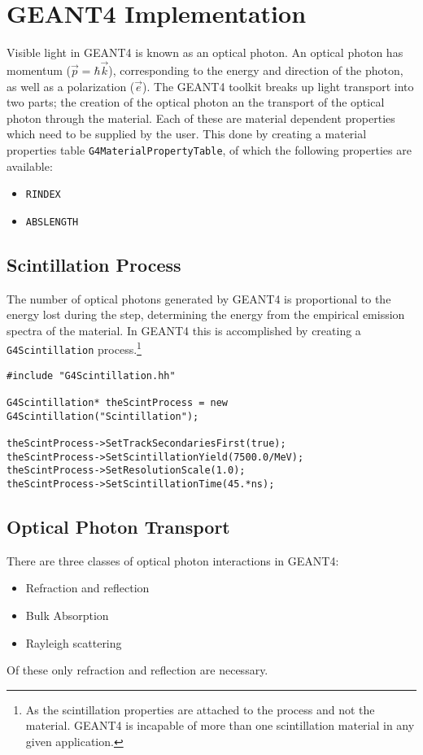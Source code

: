 

\section*{GEANT4 Implementation}
Visible light in GEANT4 is known as an optical photon.
An optical photon has momentum ($\vec{p} = \hbar \vec{k}$), corresponding to the energy and direction of the photon, as well as a polarization ($\vec{e}$).
The GEANT4 toolkit breaks up light transport into two parts; the creation of the optical photon an  the transport of the optical photon through the material.
Each of these are material dependent properties which need to be supplied by the user.
This done by creating a material properties table \lstinline{G4MaterialPropertyTable}, of which the following properties are available:
\begin{itemize}
    \item \verb+RINDEX+
    \item \verb+ABSLENGTH+
\end{itemize}
\subsection*{Scintillation Process}
The number of optical photons generated by GEANT4 is proportional to the energy lost during the step, determining the energy from the empirical emission spectra of the material.
In GEANT4 this is accomplished by creating a \verb+G4Scintillation+ process.\footnote{As the scintillation properties are attached to the process and not the material. GEANT4 is incapable of more than one scintillation material in any given application.}
\begin{lstlisting}
#include "G4Scintillation.hh"

G4Scintillation* theScintProcess = new G4Scintillation("Scintillation");

theScintProcess->SetTrackSecondariesFirst(true);
theScintProcess->SetScintillationYield(7500.0/MeV);
theScintProcess->SetResolutionScale(1.0);
theScintProcess->SetScintillationTime(45.*ns);
\end{lstlisting}

\subsection*{Optical Photon Transport}
There are three classes of optical photon interactions in GEANT4:
\begin{itemize}
    \item Refraction and reflection
    \item Bulk Absorption
    \item Rayleigh scattering
\end{itemize}
Of these only refraction and reflection are necessary. \cite{cern_interactionsOfOpticalPhotons}

